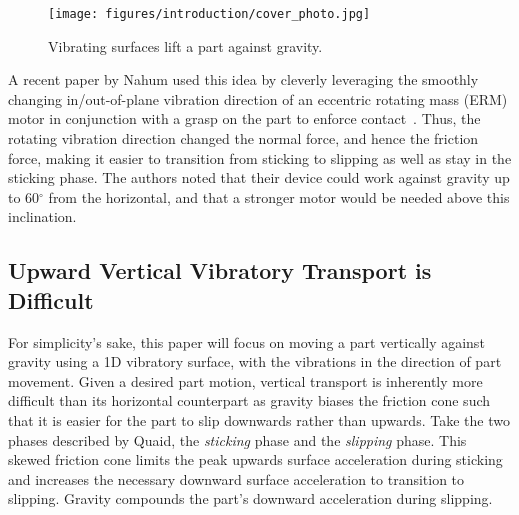 %
\begin{figure}[t]
    \centering
    \texttt{[image: figures/introduction/cover\_photo.jpg]}
    \caption{Vibrating surfaces lift a part against gravity.}
    \label{figure: cover photo}
    \vspace{\shift}
\end{figure}
%

A recent paper by Nahum used this idea by cleverly leveraging the smoothly changing in/out-of-plane vibration direction of an eccentric rotating mass (ERM) motor in conjunction with a grasp on the part to enforce contact~\cite{nahum2022robotic}. 
%
Thus, the rotating vibration direction changed the normal force, and hence the friction force, making it easier to transition from sticking to slipping as well as stay in the sticking phase. 
%
The authors noted that their device could work against gravity up to 60$^\circ$ from the horizontal, and that a stronger motor would be needed above this inclination.

\subsection{Upward Vertical Vibratory Transport is Difficult}

For simplicity's sake, this paper will focus on moving a part vertically against gravity using a 1D vibratory surface, with the vibrations in the direction of part movement.
%
Given a desired part motion, vertical transport is inherently more difficult than its horizontal counterpart as gravity biases the friction cone such that it is easier for the part to slip downwards rather than upwards. 
%
Take the two phases described by Quaid, the \textit{sticking} phase and the \textit{slipping} phase. 
%
This skewed friction cone limits the peak upwards surface acceleration during sticking and increases the necessary downward surface acceleration to transition to slipping.
%
Gravity compounds the part's downward acceleration during slipping.

